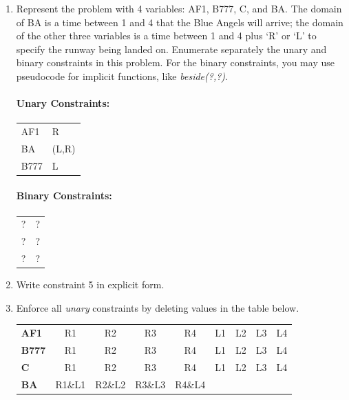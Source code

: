 \documentclass[12pt]{article}
\begin{document}
\begin{enumerate}

\item Represent the problem with 4 variables: AF1, B777, C, and
  BA. The domain of BA is a time between 1 and 4 that the Blue Angels
  will arrive; the domain of the other three variables is a time
  between 1 and 4 plus `R' or `L' to specify the runway being landed
  on.  Enumerate separately the unary and binary constraints in this
  problem. For the binary constraints, you may use pseudocode for
  implicit functions, like {\it beside(?,?)}.

  \paragraph{Unary Constraints:}

  \begin{flushleft}\begin{tabular}{ll}
  AF1  & R \\
  BA  & (L,R) \\
  B777 & L\\
  \end{tabular}\end{flushleft}

  \paragraph{Binary Constraints:}

  \begin{flushleft}\begin{tabular}{ll}
  ?  & ? \\
  ?  & ? \\
  ?  & ? \\
  \end{tabular}\end{flushleft}

\item Write constraint 5 in explicit form. \\

\item Enforce all {\it unary} constraints by deleting values in the table below.

\begin{center}\begin{tabular}{l|cccccccc|}
{\bf AF1}  & R1 & R2 & R3 & R4 & L1 & L2 & L3 & L4 \\ 
{\bf B777} & R1 & R2 & R3 & R4 & L1 & L2 & L3 & L4 \\ 
{\bf C}    & R1 & R2 & R3 & R4 & L1 & L2 & L3 & L4 \\ 
{\bf BA}   & R1\&L1 & R2\&L2 & R3\&L3 & R4\&L4 &  &  &  &  \\ 
\end{tabular}\end{center}


\end{enumerate}
\end{document}
